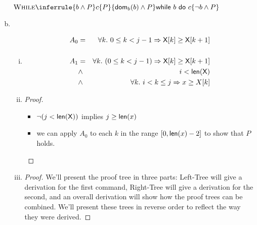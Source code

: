 \begin{enumerate}[(a)]
$\Rule{While}{
    \{ b \wedge P \}
    c
    \{ P \}
}{
    \{ \dom_b(b) \wedge P \}
    \whilestmt{b}{c}
    \{ \neg b \wedge P \}
}$

\item
\begin{enumerate}[i.]
    \item
    \begin{eqnarray*}
        A_0 & = & \forall k .~0 \leq k < j - 1 \Rightarrow  {\sf X}[k] \geq {\sf X}[k + 1] \\
              & & \\
        A_1 & = & \forall k.~(0 \leq k < j - 1) \Rightarrow \textsf{X}[k] \geq \textsf{X}[k + 1] \\
              & \wedge     & i < \textsf{len}(\textsf{X}) \\
              & \wedge     & \forall k .~i < k \leq j \Rightarrow  x \geq X[k]
    \end{eqnarray*}

    \item
    \begin{proof} \hspace{1cm} \\
        \begin{itemize}
        \item $\neg (j < {\sf len(X)})$ implies $j \geq {\sf len}(x)$
        \item we can apply $A_0$ to each $k$ in the range
        $[0, {\sf len}(x) - 2]$ to show that $P$ holds.
        \end{itemize}
    \end{proof}

    \item
    \begin{proof} We'll present the proof tree in three parts: Left-Tree will
        give a derivation for the first command, Right-Tree will give a
        derivation for the second, and an overall derivation will
        show how the proof trees can be combined. We'll present these trees
        in reverse order to reflect the way they were derived.

        \newcommand{\leftPremise}{
            \{ \dom_a(i + 1) \wedge \dom_a({\sf X}[i])
               \wedge A_1[i - 1 / i][i + 1 \mapsto \X[\X[i]
             \}
             ~\X[i = 1] = \X[i]~
             \{ A_1[i - 1/ i] \}
        }

        \newcommand{\leftBase}{
            \{ A_1 \wedge ((i \geq 0) \wedge {\sf X}[i] < x) \}
            ~\X[i = 1] = \X[i]~
            \{ A_1[i - 1/ i] \}
        }


\end{proof}
\end{enumerate}
\end{enumerate}
